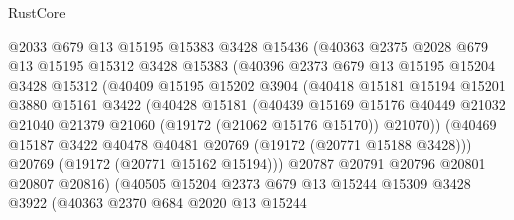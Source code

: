 \begin{lexlean}{RustCore}
\begin{coremodule}
                    @2033
                    @679
                    @13
                    @15195
                    @15383
                    @3428
                    @15436
                    (@40363
                      @2375
                      @2028
                      @679
                      @13
                      @15195
                      @15312
                      @3428
                      @15383
                      (@40396
                        @2373
                        @679
                        @13
                        @15195
                        @15204
                        @3428
                        @15312
                        (@40409
                          @15195
                          @15202
                          @3904
                          (@40418
                            @15181
                            @15194
                            @15201
                            @3880
                            @15161
                            @3422
                            (@40428
                              @15181
                              (@40439
                                @15169
                                @15176
                                @40449
                                @21032
                                @21040
                                @21379
                                @21060
                                (@19172 (@21062 @15176 @15170))
                                @21070))
                            (@40469
                              @15187
                              @3422
                              @40478
                              @40481
                              @20769
                              (@19172 (@20771 @15188 @3428)))
                            @20769
                            (@19172 (@20771 @15162 @15194)))
                          @20787
                          @20791
                          @20796
                          @20801
                          @20807
                          @20816)
                        (@40505
                          @15204
                          @2373
                          @679
                          @13
                          @15244
                          @15309
                          @3428
                          @3922
                          (@40363
                            @2370
                            @684
                            @2020
                            @13
                            @15244

\end{coremodule}
\end{lexlean}
